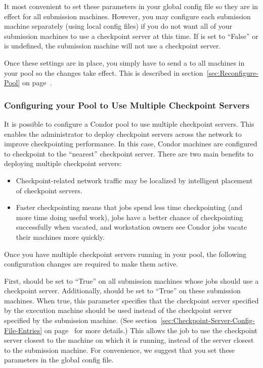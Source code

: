 It most convenient to set these parameters in your global config file
so they are in effect for all submission machines.
However, you may configure each submission machine separately (using
local config files) if you do not want all of your submission machines
to use a checkpoint server at this time.
If  is set to ``False'' or is undefined, the
submission machine will not use a checkpoint server.

Once these settings are in place, you simply have to send a
 to all machines in your pool so the changes take
effect.
This is described in section~\ref{sec:Reconfigure-Pool} on
page~\pageref{sec:Reconfigure-Pool}.

\subsubsection{\label{sec:Configure-Multiple-Ckpt-Server} 
Configuring your Pool to Use Multiple Checkpoint Servers}

It is possible to configure a Condor pool to use multiple checkpoint
servers.
This enables the administrator to deploy checkpoint servers across the
network to improve checkpointing performance.
In this case, Condor machines are configured to checkpoint to the
``nearest'' checkpoint server.
There are two main benefits to deploying multiple checkpoint
servers:
\begin{itemize}
\item Checkpoint-related network traffic may be localized by
intelligent placement of checkpoint servers.
\item Faster checkpointing means that jobs spend less time
checkpointing (and more time doing useful work), jobs have a better
chance of checkpointing successfully when vacated, and workstation
owners see Condor jobs vacate their machines more quickly.
\end{itemize}

Once you have multiple checkpoint servers running in your pool, the
following configuration changes are required to make them active.

First,  should be set to ``True'' on all
submission machines whose jobs should use a checkpoint server.
Additionally,  should be set to
``True'' on these submission machines.
When true, this parameter specifies that the checkpoint server
specified by the execution machine should be used instead of the
checkpoint server specified by the submission machine.
(See section~\ref{sec:Checkpoint-Server-Config-File-Entries} on
page~\pageref{sec:Checkpoint-Server-Config-File-Entries} for more
details.)
This allows the job to use the checkpoint server closest to the
machine on which it is running, instead of the server closest to the
submission machine.
For convenience, we suggest that you set these parameters in the
global config file.

